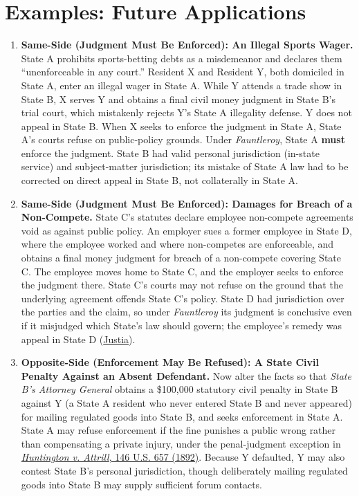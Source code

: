 \documentclass[12pt]{article}
\begin{document}
\section{Examples: Future Applications}
\begin{enumerate}

\item \textbf{Same-Side (Judgment Must Be Enforced): An Illegal Sports Wager.} State A prohibits sports-betting debts as a misdemeanor and declares them ``unenforceable in any court.'' Resident X and Resident Y, both domiciled in State A, enter an illegal wager in State A. While Y attends a trade show in State B, X serves Y and obtains a final civil money judgment in State B's trial court, which mistakenly rejects Y's State A illegality defense. Y does not appeal in State B. When X seeks to enforce the judgment in State A, State A's courts refuse on public-policy grounds. Under \textit{Fauntleroy}, State A \textbf{must} enforce the judgment. State B had valid personal jurisdiction (in-state service) and subject-matter jurisdiction; its mistake of State A law had to be corrected on direct appeal in State B, not collaterally in State A.

\item \textbf{Same-Side (Judgment Must Be Enforced): Damages for Breach of a Non-Compete.} State C's statutes declare employee non-compete agreements void as against public policy. An employer sues a former employee in State D, where the employee worked and where non-competes are enforceable, and obtains a final money judgment for breach of a non-compete covering State C. The employee moves home to State C, and the employer seeks to enforce the judgment there. State C's courts may not refuse on the ground that the underlying agreement offends State C's policy. State D had jurisdiction over the parties and the claim, so under \textit{Fauntleroy} its judgment is conclusive even if it misjudged which State's law should govern; the employee's remedy was appeal in State D (\href{https://supreme.justia.com/cases/federal/us/210/230/}{Justia}).

\item \textbf{Opposite-Side (Enforcement May Be Refused): A State Civil Penalty Against an Absent Defendant.} Now alter the facts so that \textit{State B's Attorney General} obtains a \$100,000 statutory civil penalty in State B against Y (a State A resident who never entered State B and never appeared) for mailing regulated goods into State B, and seeks enforcement in State A. State A may refuse enforcement if the fine punishes a public wrong rather than compensating a private injury, under the penal-judgment exception in \href{https://supreme.justia.com/cases/federal/us/146/657/}{\textit{Huntington v. Attrill}, 146 U.S. 657 (1892)}. Because Y defaulted, Y may also contest State B's personal jurisdiction, though deliberately mailing regulated goods into State B may supply sufficient forum contacts.


\end{enumerate}
\end{document}
